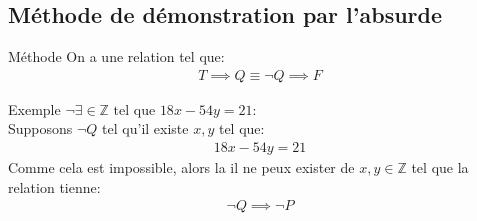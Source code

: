 \subsection{Méthode de démonstration par l'absurde}
\begin{parag}{Méthode}
    On a une relation tel que:
    \begin{align*}
        T \implies Q \equiv \neg Q \implies F
    \end{align*}
    \begin{subparag}{Exemple}
        $\neg \exists \in \mathbb{Z} \text{ tel que } 18x - 54 y = 21$:
        \\
        Supposons $\neg Q$ tel qu'il existe $x, y$ tel que:
        \begin{align*}
            18x - 54 y = 21 
        \end{align*}
        Comme cela est impossible, alors la il ne peux exister de $x, y \in \mathbb{Z}$ tel que la relation tienne:
        \begin{align*}
            \neg Q \implies \neg P
        \end{align*}
    \end{subparag}
\end{parag}

